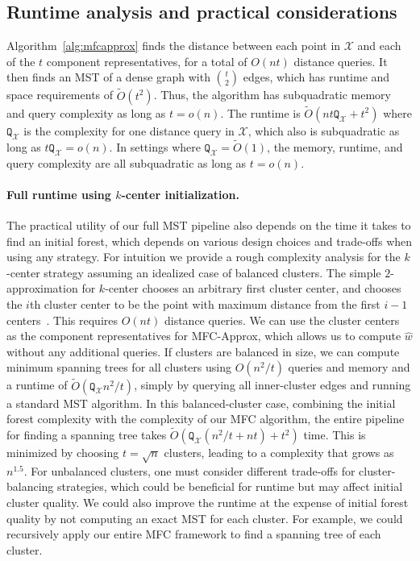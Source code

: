 \subsection{Runtime analysis and practical considerations}
Algorithm~\ref{alg:mfcapprox} finds the distance between each point in $\mathcal{X}$ and each of the $t$ component representatives, for a total of $O(nt)$ distance queries. It then finds an MST of a dense graph with ${t \choose 2}$ edges, which has runtime and space requirements of $\tilde{O}(t^2)$. Thus, the algorithm has subquadratic memory and query complexity as long as $t = o(n)$. The runtime is $\tilde{O}(nt\texttt{Q}_\mathcal{X} + t^2)$ where $\texttt{Q}_\mathcal{X}$ is the complexity for one distance query in $\mathcal{X}$, which also is subquadratic as long as $t\texttt{Q}_\mathcal{X} = o(n)$. In settings where $\texttt{Q}_\mathcal{X} = \tilde{O}(1)$, the memory, runtime, and query complexity are all subquadratic as long as $t = o(n)$.


\paragraph{Full runtime using $k$-center initialization.} The practical utility of our full MST pipeline also depends on the time it takes to find an initial forest, which depends on various design choices and trade-offs when using any strategy. For intuition we provide a rough complexity analysis for the $k$-center strategy assuming an idealized case of balanced clusters. The simple $2$-approximation for $k$-center chooses an arbitrary first cluster center, and chooses the $i$th cluster center to be the point with maximum distance from the first $i - 1$ centers~\cite{gonzalez1985clustering}. This requires $O(nt)$ distance queries. We can use the cluster centers as the component representatives for \textsf{MFC-Approx}, which allows us to compute $\hat{w}$ without any additional queries. If clusters are balanced in size, we can compute minimum spanning trees for all clusters using $O(n^2/t)$ queries and memory and a runtime of $\tilde{O}(\texttt{Q}_\mathcal{X}n^2/t)$, simply by querying all inner-cluster edges and running a standard MST algorithm. In this balanced-cluster case, combining the initial forest complexity with the complexity of our MFC algorithm, the entire pipeline for finding a spanning tree takes $\tilde{O}(\texttt{Q}_\mathcal{X}(n^2/t + nt) + t^2)$ time. This is minimized by choosing $t = \sqrt{n}$ clusters, leading to a complexity that grows as $n^{1.5}$. For unbalanced clusters, one must consider different trade-offs for cluster-balancing strategies, which could be beneficial for runtime but may affect initial cluster quality.
We could also improve the runtime at the expense of initial forest quality by not computing an exact MST for each cluster. For example, we could recursively apply our entire MFC framework to find a spanning tree of each cluster. 


